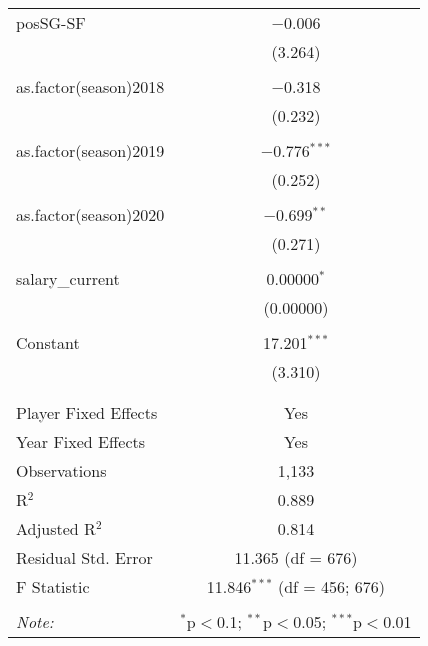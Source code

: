 \documentclass[a4paper,11pt]{article}
\begin{document}
\begin{table}[!htbp]
{\begin{tabular}{@{\extracolsep{5pt}}lc}
 posSG-SF & $-$0.006 \\ 
  & (3.264) \\ 
  & \\ 
 as.factor(season)2018 & $-$0.318 \\ 
  & (0.232) \\ 
  & \\ 
 as.factor(season)2019 & $-$0.776$^{***}$ \\ 
  & (0.252) \\ 
  & \\ 
 as.factor(season)2020 & $-$0.699$^{**}$ \\ 
  & (0.271) \\ 
  & \\ 
 salary\_current & 0.00000$^{*}$ \\ 
  & (0.00000) \\ 
  & \\ 
 Constant & 17.201$^{***}$ \\ 
  & (3.310) \\ 
  & \\ 
\hline \\[-1.8ex] 
Player Fixed Effects & Yes \\ 
Year Fixed Effects & Yes \\ 
Observations & 1,133 \\ 
R$^{2}$ & 0.889 \\ 
Adjusted R$^{2}$ & 0.814 \\ 
Residual Std. Error & 11.365 (df = 676) \\ 
F Statistic & 11.846$^{***}$ (df = 456; 676) \\ 
\hline 
\hline \\[-1.8ex] 
\textit{Note:}  & \multicolumn{1}{r}{$^{*}$p$<$0.1; $^{**}$p$<$0.05; $^{***}$p$<$0.01} \\ 
\end{tabular} }
\end{table} 
\end{document}

